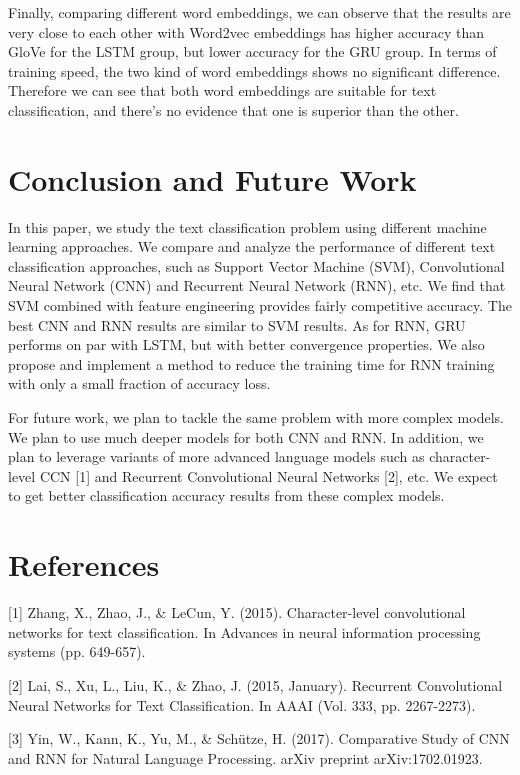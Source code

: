 \documentclass{article}
\begin{document}
Finally, comparing different word embeddings, we can observe that the results are very close to each other with Word2vec embeddings has higher accuracy than GloVe for the LSTM group, but lower accuracy for the GRU group. In terms of training speed, the two kind of word embeddings shows no significant difference. Therefore we can see that both word embeddings are suitable for text classification, and there's no evidence that one is superior than the other.




\section{Conclusion and Future Work}
In this paper, we study the text classification problem using different machine learning approaches.  We compare and analyze the performance of different text classification approaches, such as Support Vector Machine (SVM), Convolutional Neural Network (CNN) and Recurrent Neural Network (RNN), etc. We find that SVM combined with feature engineering provides fairly competitive accuracy. The best CNN and RNN results are similar to SVM results. As for RNN, GRU performs on par with LSTM, but with better convergence properties. We also propose and implement a method to reduce the training time for RNN training with only a small fraction of accuracy loss.

For future work, we plan to tackle the same problem with more complex models. We plan to use much deeper models for both CNN and RNN. In addition, we plan to leverage variants of more advanced language models such as character-level CCN [1] and Recurrent Convolutional Neural Networks [2], etc. We expect to get better classification accuracy results from these complex models.

\section*{References}

\small

[1] Zhang, X., Zhao, J., \& LeCun, Y. (2015). Character-level convolutional networks for text classification. In Advances in neural information processing systems (pp. 649-657).

[2] Lai, S., Xu, L., Liu, K., \& Zhao, J. (2015, January). Recurrent Convolutional Neural Networks for Text Classification. In AAAI (Vol. 333, pp. 2267-2273).

[3] Yin, W., Kann, K., Yu, M., \& Schütze, H. (2017). Comparative Study of CNN and RNN for Natural Language Processing. arXiv preprint arXiv:1702.01923.
\end{document}
